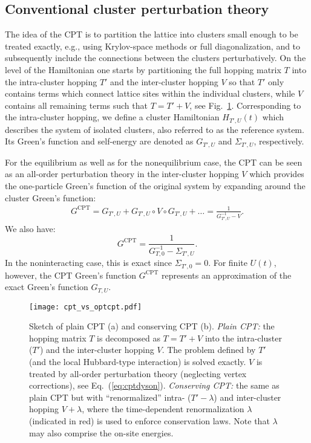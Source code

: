 \documentclass[twocolumn,prb,showpacs,aps,superscriptaddress]{revtex4}
\begin{document}
\subsection{Conventional cluster perturbation theory}
\label{sec:cpt}

The idea of the CPT \cite{SPPL00,GV93} is to partition the lattice into
clusters small enough to be treated exactly, e.g., using Krylov-space methods
or full diagonalization, and to subsequently include the connections between
the clusters perturbatively. On the level of the Hamiltonian one starts by
partitioning the full hopping matrix $T$ into the intra-cluster hopping $T'$
and the inter-cluster hopping $V$ so that $T'$ only contains terms which
connect lattice sites within the individual clusters, while $V$ contains all
remaining terms such that $T=T'+V$, see Fig.\ \ref{fig:cpt_vs_optcpt}.
Corresponding to the intra-cluster hopping, we define a cluster Hamiltonian
$H_{T', U}(t)$ which describes the system of isolated clusters, also referred
to as the reference system.  Its Green's function and self-energy are denoted
as $G_{T', U}$ and $\Sigma_{T', U}$, respectively.  

For the equilibrium as well as for the nonequilibrium case,
\cite{BP11,JP13,GP15} the CPT can be seen as an all-order perturbation theory
in the inter-cluster hopping $V$ which provides the one-particle Green's
function of the original system by expanding around the cluster Green's
function:
\begin{align}
	\label{eq:cptdyson}
  G^\mathrm{CPT} 
  = 
  G_{T', U} + G_{T', U}\circ V\circ G_{T', U} + \dots
  = 
  \frac{1}{G_{T', U}^{-1}-V} . 
\end{align}
We also have:
\begin{equation}  
  G^\mathrm{CPT} 
  = 
  \frac{1}{G_{T,0}^{-1}-\Sigma_{T', U}} . 
\end{equation}
In the noninteracting case, this is exact since $\Sigma_{T', 0}=0$.  For finite
$U(t)$, however, the CPT Green's function $G^\mathrm{CPT}$ represents an
approximation of the exact Green's function $G_{T,U}$.

\begin{figure}
\texttt{[image: cpt\_vs\_optcpt.pdf]}
\caption{
  Sketch of plain CPT (a) and conserving CPT (b).  {\em Plain CPT:} the hopping
  matrix $T$ is decomposed as $T=T'+V$ into the intra-cluster ($T'$) and the
  inter-cluster hopping $V$.  The problem defined by $T'$ (and the local
  Hubbard-type interaction) is solved exactly.  $V$ is treated by all-order
  perturbation theory (neglecting vertex corrections), see Eq.\
  (\ref{eq:cptdyson}).  {\em Conserving CPT:} the same as plain CPT but with
  ``renormalized'' intra- ($T'-\lambda$) and inter-cluster hopping $V+\lambda$,
  where the time-dependent renormalization $\lambda$ (indicated in red) is used
  to enforce conservation laws.  Note that $\lambda$ may also comprise the
  on-site energies.  
}
\label{fig:cpt_vs_optcpt}
\end{figure}
\end{document}
